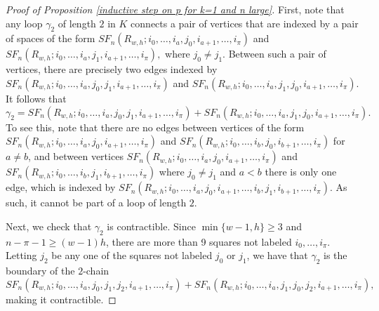 \documentclass[pagebackref,colorlinks,citecolor=blue,linkcolor=blue,urlcolor=blue,filecolor=blue]{article}
\theoremstyle{definition}\newtheorem{definition}[thm]{Definition}
\theoremstyle{definition}
\begin{document}
\begin{proof}[Proof of Proposition \ref{inductive step on p for k=1 and n large}]
First, note that any loop $\gamma_{2}$ of length $2$ in $K$ connects a pair of vertices that are indexed by a pair of spaces of the form $SF_{n}(R_{w, h}; i_{0}, \dots, i_{a}, j_{0}, i_{a+1}, \dots, i_{\pi})$ and $SF_{n}(R_{w, h}; i_{0}, \dots, i_{a}, j_{1}, i_{a+1}, \dots, i_{\pi}),$ where $j_{0}\neq j_{1}$.
Between such a pair of vertices, there are precisely two edges indexed by $SF_{n}(R_{w, h}; i_{0}, \dots, i_{a}, j_{0}, j_{1}, i_{a+1}, \dots, i_{\pi})$ and $SF_{n}(R_{w, h}; i_{0}, \dots, i_{a}, j_{1}, j_{0}, i_{a+1}, \dots, i_{\pi})$.
It follows that
\[
\gamma_{2}=SF_{n}(R_{w, h}; i_{0}, \dots, i_{a}, j_{0}, j_{1}, i_{a+1}, \dots, i_{\pi})+SF_{n}(R_{w, h}; i_{0}, \dots, i_{a}, j_{1}, j_{0}, i_{a+1}, \dots, i_{\pi}).
\]
To see this, note that there are no edges between vertices of the form $SF_{n}(R_{w, h}; i_{0}, \dots, i_{a}, j_{0}, i_{a+1}, \dots, i_{\pi})$ and $SF_{n}(R_{w, h}; i_{0}, \dots, i_{b}, j_{0}, i_{b+1}, \dots, i_{\pi})$ for $a\neq b$, and between vertices $SF_{n}(R_{w, h}; i_{0}, \dots, i_{a}, j_{0}, i_{a+1}, \dots, i_{\pi})$ and $SF_{n}(R_{w, h}; i_{0}, \dots, i_{b}, j_{1}, i_{b+1}, \dots, i_{\pi})$ where $j_{0}\neq j_{1}$ and $a<b$ there is only one edge, which is indexed by $SF_{n}(R_{w, h}; i_{0}, \dots, i_{a}, j_{0}, i_{a+1}, \dots,i_{b}, j_{1}, i_{b+1}, \dots,  i_{\pi})$.
As such, it cannot be part of a loop of length $2$.

Next, we check that $\gamma_{2}$ is contractible.
Since $\min\{w-1, h\}\ge 3$ and $n-\pi-1\ge (w-1)h$, there are more than 9 squares not labeled $i_{0}, \dots, i_{\pi}$. 
Letting $j_{2}$ be any one of the squares not labeled $j_{0}$ or $j_{1}$, we have that  $\gamma_{2}$ is the boundary of the $2$-chain
\[
SF_{n}(R_{w, h}; i_{0}, \dots, i_{a}, j_{0}, j_{1}, j_{2}, i_{a+1}, \dots, i_{\pi})+SF_{n}(R_{w, h}; i_{0}, \dots, i_{a}, j_{1}, j_{0}, j_{2}, i_{a+1}, \dots, i_{\pi}),
\]
making it contractible.


\end{proof}
\end{document}
